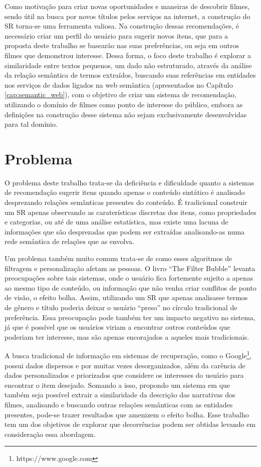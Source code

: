 Como motivação para criar novas oportunidades e maneiras de descobrir filmes, sendo útil na busca por novos títulos pelos serviços na internet, a construção do \ac{SR} torna-se uma ferramenta valiosa. Na construção dessas recomendações, é necessário criar um perfil do usuário para sugerir novos itens, que para a proposta deste trabalho se basearão nas suas preferências, ou seja em outros filmes que demonstrou interesse. Dessa forma, o foco deste trabalho é explorar a similaridade entre textos pequenos, um dado não estruturado, através da análise da relação semântica de termos extraídos, buscando suas referências em entidades nos serviços de dados ligados na web semântica (apresentados no Capítulo \ref{cap:semantic_web}), com o objetivo de criar um sistema de recomendação, utilizando o domínio de filmes como ponto de interesse do público, embora as definições na construção desse sistema não sejam exclusivamente desenvolvidas para tal domínio.

\section{Problema}
O problema deste trabalho trata-se da deficiência e dificuldade quanto a sistemas de recomendação sugerir itens quando apenas o conteúdo sintático é analisado desprezando relações semânticas presentes do conteúdo. É tradicional construir um SR apenas observando as caraterísticas discretas dos itens, como propriedades e categorias, ou até de uma análise estatística, mas existe uma lacuna de informações que são desprezadas que podem ser extraídas analisando-as numa rede semântica de relações que as envolva.

Um problema também muito comum trata-se de como esses algoritmos de filtragem e personalização afetam as pessoas. O livro “The Filter Bubble” \cite{Pariser:2011} levanta preocupações sobre tais sistemas, onde o usuário fica fortemente sujeito a apenas ao mesmo tipo de conteúdo, ou informação que não venha criar conflitos de ponto de visão, o efeito bolha. Assim, utilizando um SR que apenas analisasse termos de gênero e título poderia deixar o usuário “preso” no círculo tradicional de preferência. Essa preocupação pode também ter um impacto negativo no sistema, já que é possível que os usuários viriam a encontrar outros conteúdos que poderiam ter interesse, mas são apenas encorajados a aqueles mais tradicionais. 

A busca tradicional de informação em sistemas de recuperação, como o Google\footnote{https://www.google.com}, possui dados dispersos e por muitas vezes desorganizados, além da carência de dados personalizados e priorizados que considere os interesses do usuário para encontrar o item desejado. Somando a isso, propondo um sistema em que também seja possível extrair a similaridade da descrição das narrativas dos filmes, analisando e buscando outras relações semânticas com as entidades presentes, pode-se trazer resultados que amenizem o efeito bolha. Esse trabalho tem um dos objetivos de explorar que decorrências podem ser obtidas levando em consideração essa abordagem.

